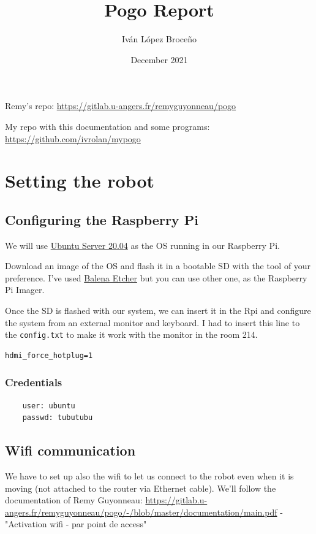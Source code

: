 \documentclass{article}
\title{\textbf{Pogo Report}}
\author{Iván López Broceño}
\date{December 2021}
\begin{document}
\maketitle

\tableofcontents

\newpage
Remy's repo: \href{https://gitlab.u-angers.fr/remyguyonneau/pogo}{https://gitlab.u-angers.fr/remyguyonneau/pogo}

My repo with this documentation and some programs: \href{https://github.com/ivrolan/my_pogo}{https://github.com/ivrolan/my\textunderscore pogo}

\section{Setting the robot}

\subsection{Configuring the Raspberry Pi}
We will use \href{https://ubuntu.com/download/server}{Ubuntu Server 20.04} as the OS running in our Raspberry Pi. 

Download an image of the OS and flash it in a bootable SD with the tool of your preference. I've used \href{https://www.balena.io/etcher/}{Balena Etcher} but you can use other one, as the Raspberry Pi Imager.

Once the SD is flashed with our system, we can insert it in the Rpi and configure the system from an external monitor and keyboard. I had to insert this line to the \texttt{config.txt} to make it work with the monitor in the room 214.

\begin{verbatim}
hdmi_force_hotplug=1     
\end{verbatim}

\subsubsection{Credentials}
\label{Credentials} 
\begin{verbatim}
    user: ubuntu
    passwd: tubutubu
\end{verbatim}

\subsection{Wifi communication}

We have to set up also the wifi to let us connect to the robot even when it is moving (not attached to the router via Ethernet cable). We'll follow the documentation of Remy Guyonneau: \href{https://gitlab.u-angers.fr/remyguyonneau/pogo/-/blob/master/documentation/main.pdf}{https://gitlab.u-angers.fr/remyguyonneau/pogo/-/blob/master/documentation/main.pdf} - "Activation wifi - par point de access"
\end{document}
